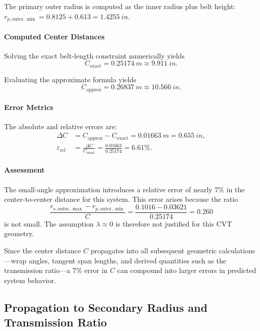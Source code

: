 \documentclass[11pt]{article}
\numberwithin{equation}{section}
\newcounter{assump}
\begin{document}
\noindent
The primary outer radius is computed as the inner radius plus belt height:
$r_{p,\text{outer},\min} = 0.8125 + 0.613 = \SI{1.4255}{in}$.

\paragraph{Computed Center Distances}

Solving the exact belt-length constraint 
numerically yields
\[
C_{\mathrm{exact}} = \SI{0.25174}{m} \approx \SI{9.911}{in}.
\]

Evaluating the approximate formula  yields
\[
C_{\mathrm{approx}} = \SI{0.26837}{m} \approx \SI{10.566}{in}.
\]

\paragraph{Error Metrics}

The absolute and relative errors are:
\begin{align}
\Delta C &= C_{\mathrm{approx}} - C_{\mathrm{exact}}
= \SI{0.01663}{m}
= \SI{0.655}{in}, \\[4pt]
\varepsilon_{\mathrm{rel}}
&= \frac{\Delta C}{C_{\mathrm{exact}}}
= \frac{0.01663}{0.25174}
= 6.61\%.
\end{align}

\paragraph{Assessment}

The small-angle approximation introduces a relative error of nearly 7\%
in the center-to-center distance for this system. This error arises because
the ratio
\[
\frac{r_{s,\text{outer},\max} - r_{p,\text{outer},\min}}{C}
=
\frac{0.1016 - 0.03621}{0.25174}
=
0.260
\]
is not small. The assumption $\lambda \approx 0$ is therefore not
justified for this CVT geometry.

Since the center distance $C$ propagates into all subsequent geometric
calculations---wrap angles, tangent span lengths, and derived quantities
such as the transmission ratio---a 7\% error in $C$ can compound into
larger errors in predicted system behavior.

\subsection{Propagation to Secondary Radius and Transmission Ratio}
\end{document}
